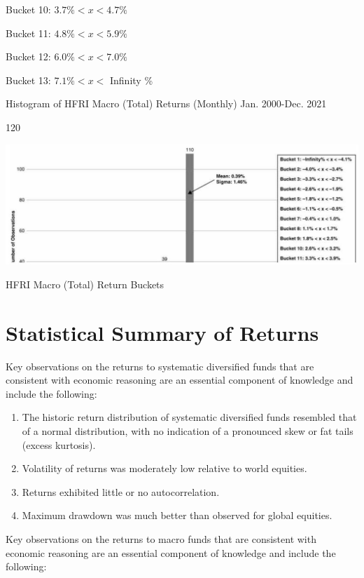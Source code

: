\documentclass[11pt]{article}
\begin{document}
Bucket 10: $3.7 \%<x<4.7 \%$

Bucket 11: $4.8 \%<x<5.9 \%$

Bucket 12: $6.0 \%<x<7.0 \%$

Bucket 13: $7.1 \%<x<$ Infinity \%

Histogram of HFRI Macro (Total) Returns (Monthly) Jan. 2000-Dec. 2021

120

\begin{center}
\includegraphics[max width=\textwidth]{2024_04_09_95e1381b1a9de89facc2g-4(2)}
\end{center}

HFRI Macro (Total) Return Buckets

\section*{Statistical Summary of Returns}
Key observations on the returns to systematic diversified funds that are consistent with economic reasoning are an essential component of knowledge and include the following:

\begin{enumerate}
  \item The historic return distribution of systematic diversified funds resembled that of a normal distribution, with no indication of a pronounced skew or fat tails (excess kurtosis).

  \item Volatility of returns was moderately low relative to world equities.

  \item Returns exhibited little or no autocorrelation.

  \item Maximum drawdown was much better than observed for global equities.

\end{enumerate}

Key observations on the returns to macro funds that are consistent with economic reasoning are an essential component of knowledge and include the following:
\end{document}
